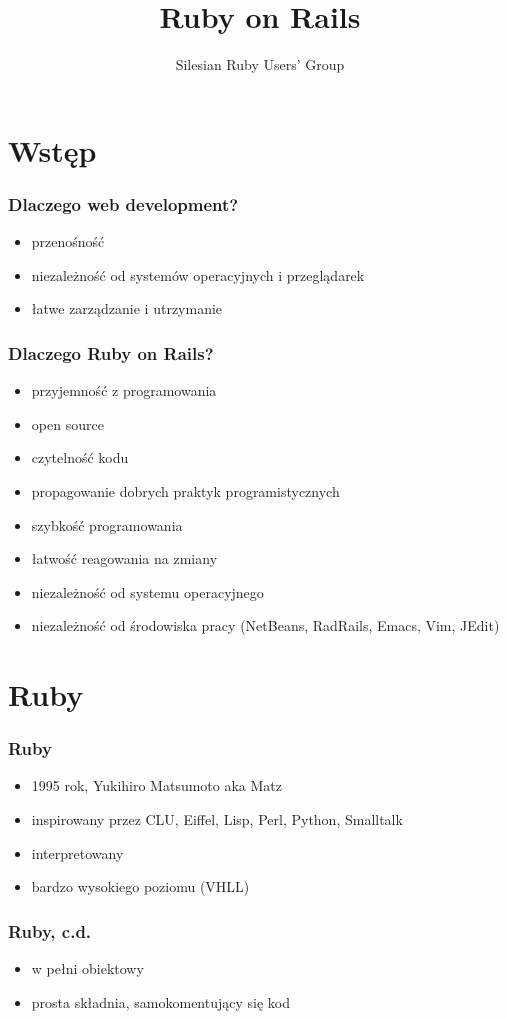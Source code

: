 \documentclass[12t]{beamer}
\author{Silesian Ruby Users' Group}
\title{Ruby on Rails}
\begin{document}
\frame{\titlepage}

\section{Wstęp}
\begin{frame}
  \frametitle{Dlaczego web development?}
  \begin{itemize}
  \item przenośność
  \item niezależność od systemów operacyjnych i przeglądarek
  \item łatwe zarządzanie i utrzymanie
  \end{itemize}
\end{frame}

\begin{frame}
  \frametitle{Dlaczego Ruby on Rails?}
  \begin{itemize}
  \item przyjemność z programowania
  \item open source
  \item czytelność kodu
  \item propagowanie dobrych praktyk programistycznych
  \item szybkość programowania
  \item łatwość reagowania na zmiany
  \item niezależność od systemu operacyjnego
  \item niezależność od środowiska pracy (NetBeans, RadRails, Emacs,
    Vim, JEdit)
  \end{itemize}
\end{frame}

\section{Ruby}
\begin{frame}
  \frametitle{Ruby}
  \begin{itemize}
  \item 1995 rok, Yukihiro Matsumoto aka Matz
  \item inspirowany przez CLU, Eiffel, Lisp, Perl, Python, Smalltalk
  \item interpretowany
  \item bardzo wysokiego poziomu (VHLL)
  \end{itemize}
\end{frame}

\begin{frame}
  \frametitle{Ruby, c.d.}
  \begin{itemize}
  \item w pełni obiektowy
  \item prosta składnia, samokomentujący się kod
  \end{itemize}
\end{frame}
\end{document}
